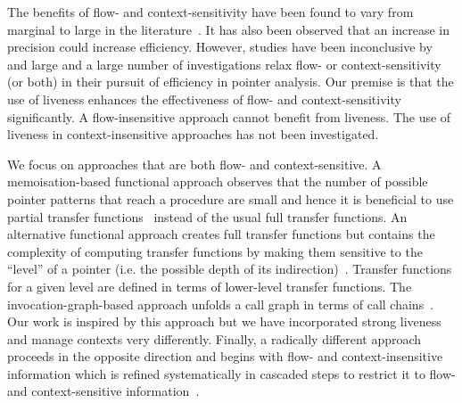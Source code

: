 \documentclass{llncs}
\begin{document}
The benefits of flow- and context-sensitivity have been found to 
vary from marginal to large in the literature~\cite{Ruf.E:1995:Context-Insensitive-Alias-Analysis,Lhotak.O.Hendren.LJ:2006:Context-sensitive-points-to-analysis,Shapiro.M.Horwitz.S:1997:Effects-of-Precision,Hind.M.Pioli.A:1998:Assessing-Effects-of}. 
It has also been observed that  an increase in precision could 
increase efficiency. However, studies have been inconclusive by and large
and a large number of investigations relax
flow- or context-sensitivity (or both) in their pursuit of efficiency in
pointer analysis.  Our premise is that the use of liveness enhances
the effectiveness of flow- and context-sensitivity significantly.
A flow-insensitive approach cannot benefit from liveness.
The use of liveness in context-insensitive approaches
has not been investigated. 



We focus on approaches that are both flow- and context-sensitive. 
A memoisation-based functional approach observes that
the number of possible pointer patterns
that reach a procedure are small and hence it is beneficial to use
partial transfer
functions~\cite{Wilson.RP.Lam.MS:1995:Efficient-Context-Sensitive-Pointer} 
instead of the usual full transfer functions.
An alternative functional approach creates full transfer
functions but contains the complexity of computing transfer functions
by making them sensitive to the ``level'' of a pointer (i.e. the
possible depth of its
indirection)~\cite{Yu.H.Xue.J.Huo.W.Feng.X.ea:2010:Level-by-level}.
Transfer functions for a given level are defined in terms of
lower-level transfer functions. 
The invocation-graph-based approach unfolds a call graph in terms
of call chains~\cite{Emami.M.Ghiya.R.Hendren.LJ:1994:Context-sensitive-interprocedural-points-to}.
Our work is inspired by this approach but we have incorporated strong liveness
and manage contexts very differently.
Finally, a radically different approach
proceeds in the opposite direction and begins with flow- and
context-insensitive information which is refined systematically
in cascaded steps to restrict it to flow- and context-sensitive
information~\cite{Kahlon.V:2008:Bootstrapping-technique-for}.
\end{document}
